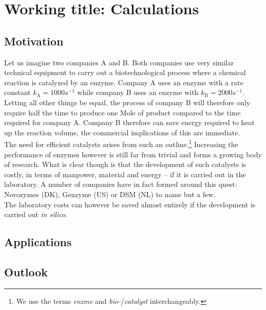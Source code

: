 
\chapter[Working title: Calculations]
{Working title: Calculations\label{ch1}}




\section{Motivation}\label{sec:mot}

Let us imagine two companies A and B.
Both companies use very similar technical equipment to carry out a biotechnological process where a chemical reaction is catalyzed by an enzyme.
Company A uses an enzyme with a rate constant $k_\text{A} = 1000s^{-1}$ while company B uses an enzyme with $k_\text{B} = 2000s^{-1}$.
Letting all other things be equal, the process of company B will therefore only require half the time to produce one Mole of product compared to the time required for company A.
Company B therefore can save energy required to heat up the reaction volume, the commercial implications of this are immediate.\\
The need for efficient catalysts arises from such an outline.\footnote{We use the terms \textit{enzme} and \textit{bio-}/\textit{catalyst} interchangeably.}
Increasing the performance of enzymes however is still far from trivial and forms a growing body of research.
What is clear though is that the development of such catalysts is costly, in terms of manpower, material and energy -- if it is carried out in the laboratory.
A number of companies have in fact formed around this quest: Novozymes (DK), Genzyme (US) or DSM (NL) to name but a few\citep{meyer2013use}.\\
The laboratory costs can however be saved almost entirely if the development is carried out \textit{in silico}.







\section{Applications}\label{sec:apps}

\section{Outlook}\label{sec:out}
